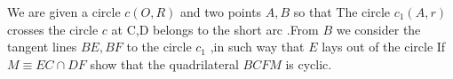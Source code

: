 We are given a circle $c(O,R)$ and two points $A,B$ so that The circle $c_1 (A,r)$  crosses the circle $c$ at C,D  belongs to the short arc .From $B$ we consider the tangent lines $BE,BF$ to the circle $c_1$ ,in such way that $E$ lays out of the circle If $M\equiv EC\cap DF$ show that the quadrilateral $BCFM$ is cyclic.